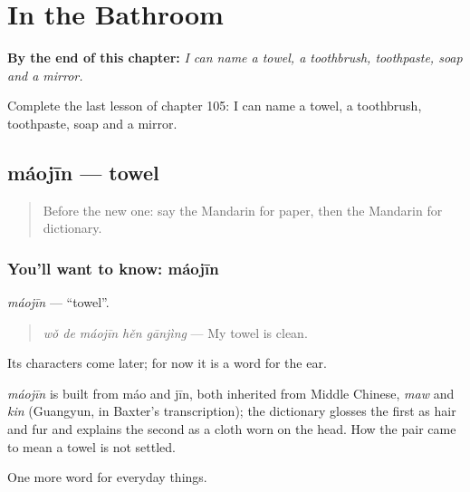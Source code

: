 
\chapter{In the Bathroom}
\label{ch:zh-in-the-bathroom}

\begin{chapteropening}
\textbf{By the end of this chapter:} \emph{I can name a towel, a toothbrush, toothpaste, soap and a mirror.}

Complete the last lesson of chapter 105: I can name a towel, a toothbrush, toothpaste, soap and a mirror.
\end{chapteropening}

\section[máojīn]{máojīn — towel}

\label{lesson:ZH-C105-maojin}



\begin{quote}
Before the new one: say the Mandarin for paper, then the Mandarin for dictionary.
\end{quote}

\subsection*{You'll want to know: máojīn}
\emph{máojīn} — \textquotedblleft{}towel\textquotedblright{}.

\begin{quote}
\emph{wǒ de máojīn hěn gānjìng} — My towel is clean.
\end{quote}

Its characters come later; for now it is a word for the ear.

\begin{cousinweb}
\emph{máojīn} is built from máo and jīn, both inherited from Middle Chinese, \emph{maw} and \emph{kin} (Guangyun, in Baxter's transcription); the dictionary glosses the first as hair and fur and explains the second as a cloth worn on the head. How the pair came to mean a towel is not settled.
\end{cousinweb}

\begin{grammarlens}[title={What you've built}]
One more word for everyday things.
\end{grammarlens}

